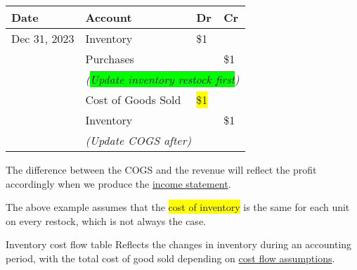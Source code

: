 \begin{tcolorbox}[colframe=black,colback=white,title=Example to compare the two inventory systems]
\begin{minipage}[t]{0.48\textwidth}
        \begin{tabular}{llll}
            \textbf{Date} & \textbf{Account}                                                               & \textbf{Dr}            & \textbf{Cr} \\
            \hline
            Dec 31, 2023  & Inventory                                                                      & \$1                    &             \\
                          & \quad Purchases                                                                &                        & \$1         \\
                          & \multicolumn{3}{l}{\textit{(\colorbox{lime}{Update inventory restock first})}}                                        \\
                          & Cost of Goods Sold                                                             & \colorbox{yellow}{\$1} &             \\
                          & \quad Inventory                                                                &                        & \$1         \\
                          & \multicolumn{3}{l}{\textit{(Update COGS after)}}                                                                      \\
        \end{tabular}
    \end{minipage}
\end{tcolorbox}
\normalsize

The difference between the COGS and the revenue will reflect the profit accordingly when we produce the \hyperref[sec:income_statement]{income statement}.

The above example assumes that the \colorbox{yellow}{cost of inventory} is the same for each unit on every restock, which is not always the case.

\begin{theorem}
    {Inventory cost flow table}
    Reflects the changes in inventory during an accounting period, with the total cost of good sold depending on \hyperref[thm:cost_flow]{cost flow assumptions}.
\end{theorem}

